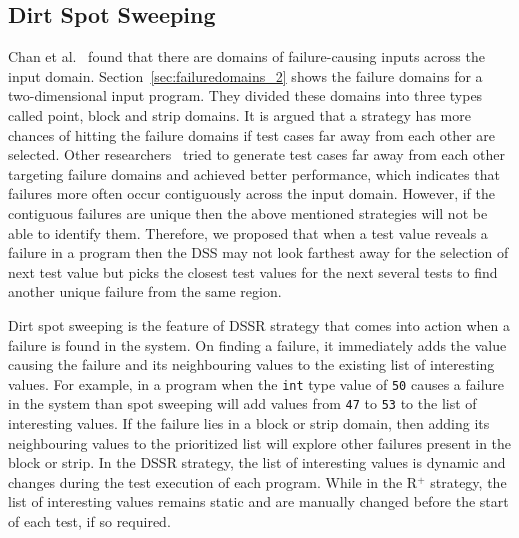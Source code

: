\subsection{Dirt Spot Sweeping}
Chan et al.~\cite{chan1996proportional} found that there are domains of failure-causing inputs across the input domain. Section~\ref{sec:failuredomains_2} shows the failure domains for a two-dimensional input program. They divided these domains into three types called point, block and strip domains. It is argued that a strategy has more chances of hitting the failure domains if test cases far away from each other are selected. Other researchers~\cite{chan2003normalized, chen2004mirror, chen2007quasi} tried to generate test cases far away from each other targeting failure domains and achieved better performance, which indicates that failures more often occur contiguously across the input domain. However, if the contiguous failures are unique then the above mentioned strategies will not be able to identify them. Therefore, we proposed that when a test value reveals a failure in a program then the DSS may not look farthest away for the selection of next test value but picks the closest test values for the next several tests to find another unique failure from the same region.






Dirt spot sweeping is the feature of DSSR strategy that comes into action when a failure is found in the system. On finding a failure, it immediately adds the value causing the failure and its neighbouring values to the existing list of interesting values. For example, in a program when the \verb+int+ type value of \verb+50+ causes a failure in the system than spot sweeping will add values from \verb+47+ to \verb+53+ to the list of interesting values. If the failure lies in a block or strip domain, then adding its neighbouring values to the prioritized list will explore other failures present in the block or strip. In the DSSR strategy, the list of interesting values is dynamic and changes during the test execution of each program. While in the R$^+$ strategy, the list of interesting values remains static and are manually changed before the start of each test, if so required.

